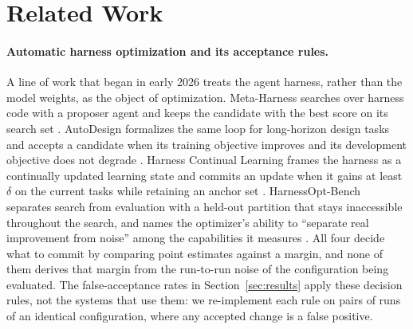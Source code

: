 
\section{Related Work}\label{sec:related}

\paragraph{Automatic harness optimization and its acceptance rules.}
A line of work that began in early 2026 treats the agent harness, rather than
the model weights, as the object of optimization. Meta-Harness searches over
harness code with a proposer agent and keeps the candidate with the best score
on its search set \citep{lee2026metaharness}. AutoDesign formalizes the same
loop for long-horizon design tasks and accepts a candidate when its training
objective improves and its development objective does not degrade
\citep{luo2026autodesign}. Harness Continual Learning frames the harness as a
continually updated learning state and commits an update when it gains at
least $\delta$ on the current tasks while retaining an anchor set
\citep{kang2026hcl}. HarnessOpt-Bench separates search from evaluation with a
held-out partition that stays inaccessible throughout the search, and names
the optimizer's ability to ``separate real improvement from noise'' among the
capabilities it measures \citep{ursekar2026harnessopt}. All four decide what to
commit by comparing point estimates against a margin, and none of them derives
that margin from the run-to-run noise of the configuration being evaluated. The
false-acceptance rates in Section~\ref{sec:results} apply these decision rules,
not the systems that use them: we re-implement each rule on pairs of runs of an
identical configuration, where any accepted change is a false positive.

